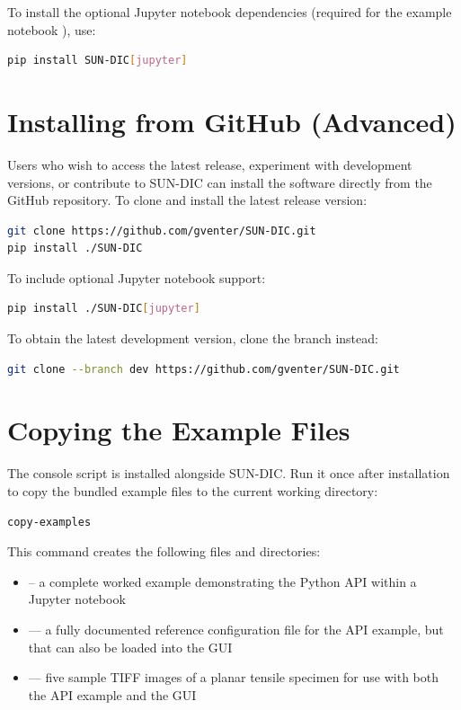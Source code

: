 \noindent
To install the optional Jupyter notebook dependencies (required for the example notebook ), use:

\begin{lstlisting}[language=bash]
pip install SUN-DIC[jupyter]
\end{lstlisting}

\section{Installing from GitHub (Advanced)}

Users who wish to access the latest release, experiment with development versions, or contribute to SUN-DIC can install the software directly from the GitHub repository.  To clone and install the latest release version:

\begin{lstlisting}[language=bash]
git clone https://github.com/gventer/SUN-DIC.git
pip install ./SUN-DIC
\end{lstlisting}

\noindent
To include optional Jupyter notebook support:

\begin{lstlisting}[language=bash]
pip install ./SUN-DIC[jupyter]
\end{lstlisting}

\noindent
To obtain the latest development version, clone the  branch instead:

\begin{lstlisting}[language=bash]
git clone --branch dev https://github.com/gventer/SUN-DIC.git
\end{lstlisting}


\section{Copying the Example Files}

The  console script is installed alongside SUN-DIC. Run it once after installation to copy the bundled example files to the current working directory:

\begin{lstlisting}[language=bash]
copy-examples
\end{lstlisting}

\noindent
This command creates the following files and directories:

\begin{itemize}
	\item {} -- a complete worked example demonstrating the Python API within a Jupyter notebook
	\item {} --- a fully documented reference configuration file for the API example, but that can also be loaded into the GUI
	\item {} --- five sample TIFF images of a planar tensile specimen for use with both the API example and the GUI
\end{itemize}

